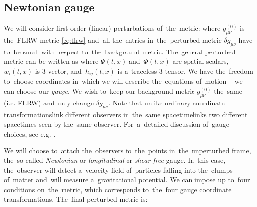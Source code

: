 \subsection{Newtonian gauge}
We will consider first-order (linear) perturbations of~the~metric:
where $g_{\mu\nu}^{(0)}$ is the~FLRW metric \eqref{eq:flrw} and~all the~entries in~the~perturbed metric $\delta g_{\mu\nu}$ have to~be small with~respect to~the~background metric. The~general perturbed metric can be written as
where $\Psi(t,x)$ and~$\Phi(t,x)$ are spatial scalars, $w_i(t,x)$ is 3-vector, and~$h_{ij}(t,x)$ is a~traceless 3-tensor. We have the~freedom to~choose coordinates in~which we will describe the~equations of~motion -- we can choose our \textit{gauge}. We wish to~keep our background metric $g_{\mu\nu}^{(0)}$ the~same (i.e. FLRW) and~only change $\delta g_{\mu\nu}$. Note that unlike ordinary coordinate transformations\DIFdelbegin {}\DIFdelend \DIFaddbegin {}\DIFaddend link different observers in~the~same spacetime\DIFdelbegin {}\DIFdelend \DIFaddbegin {}\DIFaddend links two different spacetimes seen by the~same observer. For~a~detailed discussion of~gauge choices, see e.g. \textcite{PhysRevD.40.1804,10.1143/PTPS.78.1,PhysRevD.22.1882}.

We will choose to~attach the~observers to~the~points in~the~unperturbed frame, the~so-called \textit{Newtonian} or \textit{longitudinal} or \textit{shear-free} gauge. In~this case, the~observer will detect a~velocity field of~particles falling into the~clumps of~matter and~will measure a~gravitational potential. We can impose up to~four conditions on~the~metric, which corresponds to~the~four gauge coordinate transformations. The~final perturbed metric is:
